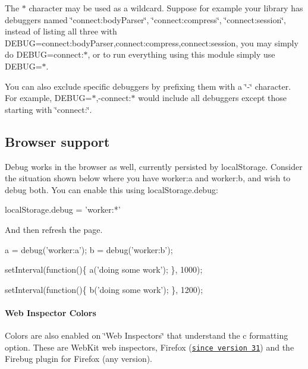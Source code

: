 The {\ttfamily $\ast$} character may be used as a wildcard. Suppose for example your library has debuggers named \char`\"{}connect\+:body\+Parser\char`\"{}, \char`\"{}connect\+:compress\char`\"{}, \char`\"{}connect\+:session\char`\"{}, instead of listing all three with {\ttfamily D\+E\+B\+UG=connect\+:body\+Parser,connect\+:compress,connect\+:session}, you may simply do {\ttfamily D\+E\+B\+UG=connect\+:$\ast$}, or to run everything using this module simply use {\ttfamily D\+E\+B\+UG=$\ast$}.

You can also exclude specific debuggers by prefixing them with a \char`\"{}-\/\char`\"{} character. For example, {\ttfamily D\+E\+B\+UG=$\ast$,-\/connect\+:$\ast$} would include all debuggers except those starting with \char`\"{}connect\+:\char`\"{}.

\subsection*{Browser support}

Debug works in the browser as well, currently persisted by {\ttfamily local\+Storage}. Consider the situation shown below where you have {\ttfamily worker\+:a} and {\ttfamily worker\+:b}, and wish to debug both. You can enable this using {\ttfamily local\+Storage.\+debug}\+:


\begin{DoxyCode}
localStorage.debug = 'worker:*'
\end{DoxyCode}


And then refresh the page.


\begin{DoxyCode}
a = debug('worker:a');
b = debug('worker:b');

setInterval(function()\{
  a('doing some work');
\}, 1000);

setInterval(function()\{
  b('doing some work');
\}, 1200);
\end{DoxyCode}


\paragraph*{Web Inspector Colors}

Colors are also enabled on \char`\"{}\+Web Inspectors\char`\"{} that understand the {\ttfamily c} formatting option. These are Web\+Kit web inspectors, Firefox (\href{https://hacks.mozilla.org/2014/05/editable-box-model-multiple-selection-sublime-text-keys-much-more-firefox-developer-tools-episode-31/}{\tt since version 31}) and the Firebug plugin for Firefox (any version).

